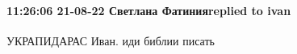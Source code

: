 
 
 
 
 

\paragraph{11:26:06 21-08-22 Светлана Фатинияreplied to ivan}

УКРАПИДАРАС Иван. иди библии писать 🤣🤣🤣🤣🤣



